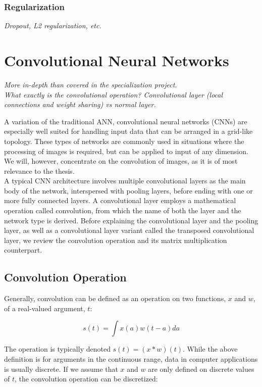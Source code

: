 \subsubsection{Regularization}

\textit{Dropout, L2 regularization, etc.}

\section{Convolutional Neural Networks}

\textit{More in-depth than covered in the specialization project. \\
What exactly is the convolutional operation? Convolutional layer (local connections and weight sharing) vs normal layer.}

A variation of the traditional ANN, convolutional neural networks (CNNs) are especially well suited for handling input data that can be arranged in a grid-like topology. These types of networks are commonly used in situations where the processing of images is required, but can be applied to input of any dimension. We will, however, concentrate on the convolution of images, as it is of most relevance to the thesis. \\

\noindent A typical CNN architecture involves multiple convolutional layers as the main body of the network, interspersed with pooling layers, before ending with one or more fully connected layers. A convolutional layer employs a mathematical operation called convolution, from which the name of both the layer and the network type is derived. Before explaining the convolutional layer and the pooling layer, as well as a convolutional layer variant called the transposed convolutional layer, we review the convolution operation and its matrix multiplication counterpart.

\subsection{Convolution Operation}

Generally, convolution can be defined as an operation on two functions, $x$ and $w$, of a real-valued argument, $t$:

$$s(t) = \int x(a)w(t-a) da$$

\noindent The operation is typically denoted $s(t) = (x*w)(t)$. While the above definition is for arguments in the continuous range, data in computer applications is usually discrete. If we assume that $x$ and $w$ are only defined on discrete values of $t$, the convolution operation can be discretized:

